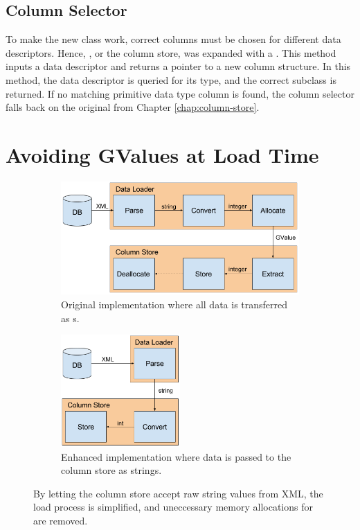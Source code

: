 \subsection{Column Selector}
\label{sub:Column Selector}
To make the new  class work, correct columns must be chosen for different data descriptors. Hence, , or the column store, was expanded with a . This method inputs a data descriptor and returns a pointer to a new column structure. In this method, the data descriptor is queried for its type, and the correct  subclass is returned. If no matching primitive data type column is found, the column selector falls back on the original  from Chapter \ref{chap:column-store}.

\section{Avoiding GValues at Load Time}
\label{sec:Avoiding GValues at Load Time}
\begin{figure}
    \centering
    \begin{subfigure}{\textwidth}
        \centering
        \includegraphics[width=\textwidth]{img/gap-load-original.png}
        \caption{Original implementation where all data is transferred as s.}
    \end{subfigure}
    \begin{subfigure}{\textwidth}
        \centering
        \includegraphics[width=0.5\textwidth]{img/gap-load-raw.png}
        \caption{Enhanced implementation where data is passed to the column store as strings.}
    \end{subfigure}
\caption{By letting the column store accept raw string values from XML, the load process is simplified, and uneccessary memory allocations for  are removed.}
\label{fig:gap-load-raw}
\end{figure}

